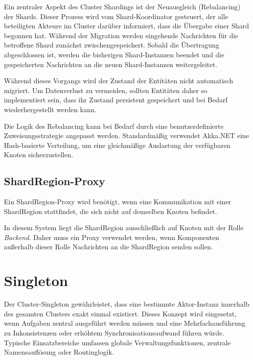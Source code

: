 Ein zentraler Aspekt des Cluster Shardings ist der Neuausgleich (Rebalancing) der Shards. Dieser Prozess wird vom 
Shard-Koordinator gesteuert, der alle beteiligten Akteure im Cluster darüber informiert, dass die Übergabe einer 
Shard begonnen hat. Während der Migration werden eingehende Nachrichten für die betroffene Shard zunächst 
zwischengespeichert. Sobald die Übertragung abgeschlossen ist, werden die bisherigen Shard-Instanzen beendet und 
die gespeicherten Nachrichten an die neuen Shard-Instanzen weitergeleitet.

Während dieses Vorgangs wird der Zustand der Entitäten nicht automatisch migriert. Um Datenverlust zu vermeiden, 
sollten Entitäten daher so implementiert sein, dass ihr Zustand persistent gespeichert und bei Bedarf 
wiederhergestellt werden kann.
\parencite{cluster_sharding_petabridge}

Die Logik des Rebalancing kann bei Bedarf durch eine benutzerdefinierte Zuweisungsstrategie angepasst werden. 
Standardmäßig verwendet Akka.NET eine Hash-basierte Verteilung, um eine gleichmäßige Auslastung der verfügbaren 
Knoten sicherzustellen.
\parencite{getakka_cluster_sharding}

\subsection{ShardRegion-Proxy}

Ein ShardRegion-Proxy wird benötigt, wenn eine Kommunikation mit einer ShardRegion stattfindet, die sich nicht 
auf demselben Knoten befindet.
\parencite{getakka_cluster_sharding}

In diesem System liegt die ShardRegion ausschließlich auf Knoten mit der Rolle \textit{Backend}. Daher muss ein 
Proxy verwendet werden, wenn Komponenten außerhalb dieser Rolle Nachrichten an die ShardRegion senden sollen.

\section{Singleton}

Der Cluster-Singleton gewährleistet, dass eine bestimmte Aktor-Instanz innerhalb des gesamten Clusters exakt einmal 
existiert. Dieses Konzept wird eingesetzt, wenn Aufgaben zentral ausgeführt werden müssen und eine Mehrfachausführung 
zu Inkonsistenzen oder erhöhtem Synchronisationsaufwand führen würde. Typische Einsatzbereiche umfassen globale 
Verwaltungsfunktionen, zentrale Namensauflösung oder Routinglogik.

